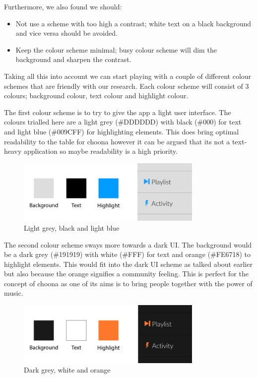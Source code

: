 \noindent Furthermore, we also found we should:
\begin{itemize}
\item Not use a scheme with too high a contrast; white text on a black background and vice versa should be avoided.
\item Keep the colour scheme minimal; busy colour scheme will dim the background and sharpen the contrast.
\end{itemize}

Taking all this into account we can start playing with a couple of different colour schemes that are friendly with our research. Each colour scheme will consist of 3 colours; background colour, text colour and highlight colour. 

The first colour scheme is to try to give the app a light user interface. The colours trialled here are a light grey (\#DDDDDD) with black (\#000) for text and light blue (\#009CFF) for highlighting elements. This does bring optimal readability to the table for choona however it can be argued that its not a text-heavy application so maybe readability is a high priority.\\

\begin{figure}[h!]
    \centering
        \includegraphics[width=0.8\textwidth]{./img/greybluecolours.png}
        \caption{Light grey, black and light blue}
        \label{fig:bluegrey}
\end{figure}

The second colour scheme sways more towards a dark UI. The background would be a dark grey (\#191919)  with white (\#FFF) for text and orange (\#FE6718) to highlight elements. This would fit into the dark UI scheme as talked about earlier but also because the orange signifies a community feeling. This is perfect for the concept of choona as one of its aims is to bring people together with the power of music. \\

\begin{figure}[h!]
\centering
\includegraphics[width=0.8\textwidth]{./img/greyorangecolours.png}
\caption{Dark grey, white and orange}
\label{fig:orangegrey}
\end{figure}

